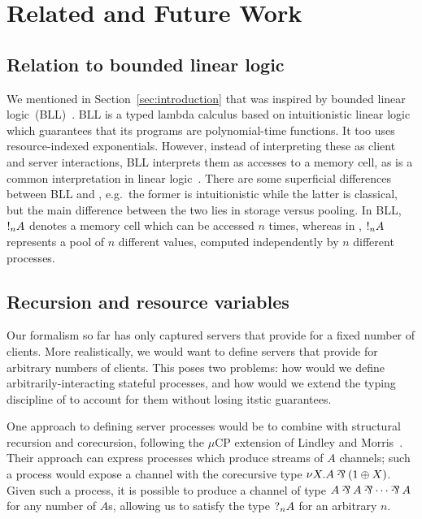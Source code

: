 \documentclass[a4paper,UKenglish]{lipics-v2016}
\begin{document}
\section{Related and Future Work}
\label{sec:conclusion}

\subsection*{Relation to bounded linear logic}
We mentioned in Section~\ref{sec:introduction} that \nodcap was inspired by
bounded linear logic~(BLL)~\cite{girard1992}. BLL is a typed lambda calculus
based on intuitionistic linear logic which guarantees that its programs are
polynomial-time functions.
It too uses resource-indexed exponentials. However, instead of interpreting
these as client and server interactions, BLL interprets them as accesses to a
memory cell, as is a common interpretation in linear logic~\cite{girard1987}.
There are some superficial differences between BLL and \nodcap, e.g.\ the former
is intuitionistic while the latter is classical, but the main difference between
the two lies in storage versus pooling. In BLL, $\take[n]{A}$ denotes a memory
cell which can be accessed $n$ times, whereas in \nodcap, $\take[n]{A}$
represents a pool of $n$ different values, computed independently by $n$
different processes.

\subsection*{Recursion and resource variables}

Our formalism so far has only captured servers that provide for a fixed number
of clients.  More realistically, we would want to define servers that provide
for arbitrary numbers of clients.  This poses two problems: how would we define
arbitrarily-interacting stateful processes, and how would we extend the
typing discipline of \nodcap to account for them without losing itstic
guarantees.

One approach to defining server processes would be to combine \nodcap with
structural recursion and corecursion, following the $\mu\text{CP}$ extension of Lindley
and Morris~\cite{lindley2016}.  Their approach can express processes which
produce streams of $A$ channels; such a process would expose a channel with the
corecursive type $\nu X. A \parr (1 \plus X)$.  Given such a process, it is
possible to produce a channel of type $A \parr A \parr \cdots \parr A$ for any
number of $A$s, allowing us to satisfy the type $\give[n]{A}$ for an arbitrary
$n$.
\end{document}
